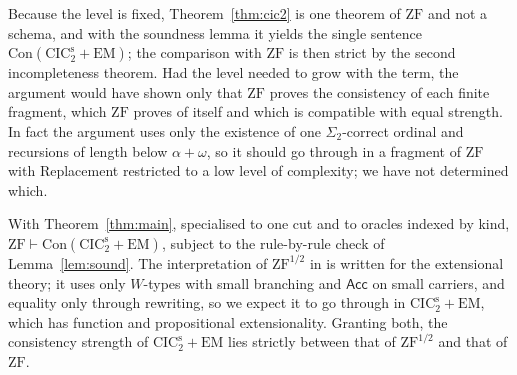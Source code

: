 \documentclass[10pt]{article}
\newcommand{\CIC}{\mathrm{CIC}}
\newcommand{\ZF}{\mathrm{ZF}}
\newcommand{\ZFh}{\mathrm{ZF}^{1/2}}
\newcommand{\EM}{\mathrm{EM}}
\newcommand{\Con}{\mathrm{Con}}
\newcommand{\Acc}{\mathsf{Acc}}
\begin{document}
\begin{remark}
Because the level is fixed, Theorem~\ref{thm:cic2} is one theorem of
$\ZF$ and not a schema, and with the soundness lemma it yields the single
sentence $\Con(\CIC_2^{\mathrm s}+\EM)$; the comparison with $\ZF$ is then
strict by the second incompleteness theorem. Had the level needed to grow
with the term, the argument would have shown only that $\ZF$ proves the
consistency of each finite fragment, which $\ZF$ proves of itself and
which is compatible with equal strength. In fact the argument uses only
the existence of one $\Sigma_2$-correct ordinal and recursions of length
below $\alpha+\omega$, so it should go through in a fragment of $\ZF$ with
Replacement restricted to a low level of complexity; we have not
determined which.
\end{remark}

\begin{corollary}\label{cor:cic2}
With Theorem~\ref{thm:main}, specialised to one cut and to oracles
indexed by kind, $\ZF\vdash\Con(\CIC_2^{\mathrm s}+\EM)$, subject to the
rule-by-rule check of Lemma~\ref{lem:sound}. The interpretation of
$\ZFh$ in \cite{paper2} is written for the extensional theory; it uses
only $W$-types with small branching and $\Acc$ on small carriers, and
equality only through rewriting, so we expect it to go through in
$\CIC_2^{\mathrm s}+\EM$, which has function and propositional
extensionality. Granting both, the consistency strength of
$\CIC_2^{\mathrm s}+\EM$ lies strictly between that of $\ZFh$ and that of
$\ZF$.
\end{corollary}
\end{document}
